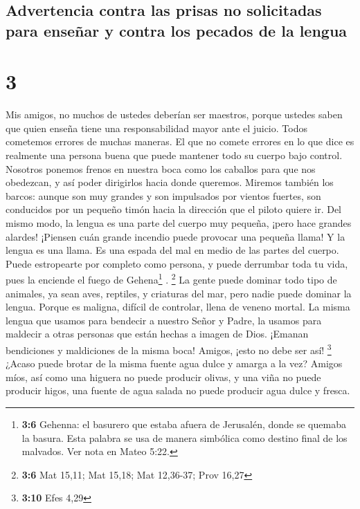 \hypertarget{advertencia-contra-las-prisas-no-solicitadas-para-enseuxf1ar-y-contra-los-pecados-de-la-lengua}{%
\subsection{Advertencia contra las prisas no solicitadas para enseñar y
contra los pecados de la
lengua}\label{advertencia-contra-las-prisas-no-solicitadas-para-enseuxf1ar-y-contra-los-pecados-de-la-lengua}}

\hypertarget{section-2}{%
\section{3}\label{section-2}}

 Mis amigos, no muchos de ustedes deberían ser maestros,
porque ustedes saben que quien enseña tiene una responsabilidad mayor
ante el juicio.  Todos cometemos errores de muchas
maneras. El que no comete errores en lo que dice es realmente una
persona buena que puede mantener todo su cuerpo bajo control.
 Nosotros ponemos frenos en nuestra boca como los caballos
para que nos obedezcan, y así poder dirigirlos hacia donde queremos.
 Miremos también los barcos: aunque son muy grandes y son
impulsados por vientos fuertes, son conducidos por un pequeño timón
hacia la dirección que el piloto quiere ir.  Del mismo
modo, la lengua es una parte del cuerpo muy pequeña, ¡pero hace grandes
alardes! ¡Piensen cuán grande incendio puede provocar una pequeña llama!
 Y la lengua es una llama. Es una espada del mal en medio
de las partes del cuerpo. Puede estropearte por completo como persona, y
puede derrumbar toda tu vida, pues la enciende el fuego de
Gehena\footnote{\textbf{3:6} Gehenna: el basurero que estaba afuera de
  Jerusalén, donde se quemaba la basura. Esta palabra se usa de manera
  simbólica como destino final de los malvados. Ver nota en Mateo 5:22.}
. \footnote{\textbf{3:6} Mat 15,11; Mat 15,18; Mat 12,36-37; Prov 16,27}
 La gente puede dominar todo tipo de animales, ya sean
aves, reptiles, y criaturas del mar,  pero nadie puede
dominar la lengua. Porque es maligna, difícil de controlar, llena de
veneno mortal.  La misma lengua que usamos para bendecir a
nuestro Señor y Padre, la usamos para maldecir a otras personas que
están hechas a imagen de Dios.  ¡Emanan bendiciones y
maldiciones de la misma boca! Amigos, ¡esto no debe ser así! \footnote{\textbf{3:10}
  Efes 4,29}  ¿Acaso puede brotar de la misma fuente agua
dulce y amarga a la vez?  Amigos míos, así como una
higuera no puede producir olivas, y una viña no puede producir higos,
una fuente de agua salada no puede producir agua dulce y fresca.


